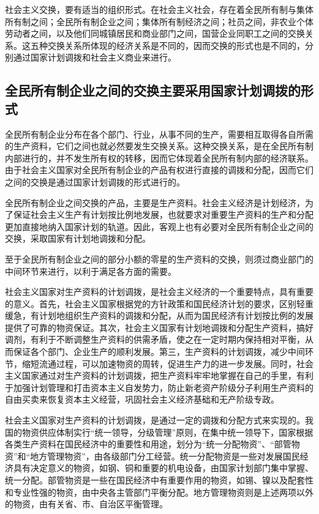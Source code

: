\documentclass{book}
\begin{document}
社会主义交换，要有适当的组织形式。在社会主义社会，存在着全民所有制与集体所有制之间；全民所有制企业之间；集体所有制经济之间；社员之间，非农业个体劳动者之间，以及他们同城镇居民和商业部门之间，国营企业同职工之间的交换关系。这五种交换关系所体现的经济关系是不同的，因而交换的形式也是不同的，分别通过国家计划调拨和社会主义商业来进行。

\subsection{全民所有制企业之间的交换主要采用国家计划调拨的形式}

全民所有制企业分布在各个部门、行业，从事不同的生产，需要相互取得各自所需的生产资料，它们之间也就必然要发生交换关系。这种交换关系，是在全民所有制内部进行的，并不发生所有权的转移，因而它体现着全民所有制内部的经济联系。由于社会主义国家对全民所有制企业的产品有权进行直接的调拨和分配，因而它们之间的交换是通过国家计划调拨的形式进行的。

全民所有制企业之间交换的产品，主要是生产资料。社会主义经济是计划经济，为了保证社会主义生产有计划按比例地发展，也就要求对重要生产资料的生产和分配更加直接地纳入国家计划的轨道。因此，客观上也有必要对全民所有制企业之间的交换，采取国家有计划地调拨和分配。

至于全民所有制企业之间的部分小额的零星的生产资料的交换，则须过商业部门的中间环节来进行，以利于满足各方面的需要。

社会主义国家对生产资料的计划调拨，是社会主义经济的一个重要特点，具有重要的意义。首先，社会主义国家根据党的方针政策和国民经济计划的要求，区别轻重缓急，有计划地组织生产资料的调拨和分配，从而为国民经济有计划按比例的发展提供了可靠的物资保证。其次，社会主义国家有计划地调拨和分配生产资料，搞好调剂，有利于不断调整生产资料的供需矛盾，使之在一定时期内保持相对平衡，从而保证各个部门、企业生产的顺利发展。第三，生产资料的计划调拨，减少中间环节，缩短流通过程，可以加速物资的周转，促进生产力的进一步发展。同时，社会主义国家通过对生产资料的计划调拨，把生产资料牢牢地掌握在自己的手里，有利于加强计划管理和打击资本主义自发势力，防止新老资产阶级分子利用生产资料的自由买卖来恢复资本主义经营，巩固社会主义经济基础和无产阶级专政。

社会主义国家对生产资料的计划调拨，是通过一定的调拨和分配方式来实现的。我国的物资供应体制实行“统一领导，分级管理”原则，在集中统一领导下，国家根据各类生产资料在国民经济中的重要性和用途，划分为“统一分配物资”、“部管物资”和“地方管理物资”，由各级部门分工经营。统一分配物资是一些对发展国民经济具有决定意义的物资，如钢、铜和重要的机电设备，由国家计划部门集中掌握、统一分配。部管物资是一些在国民经济中有重要作用的物资，如锡、镍以及配套性和专业性强的物资，由中央各主管部门平衡分配。地方管理物资则是上述两项以外的物资，由有关省、市、自治区平衡管理。
\end{document}

